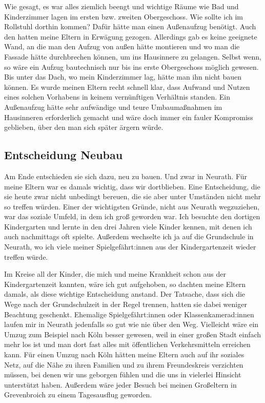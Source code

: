 \documentclass[fontsize=14pt,a4paper,headinclude,DIV=calc,automark]{scrbook}
\begin{document}
Wie gesagt, es war alles ziemlich beengt und wichtige Räume wie Bad und Kinderzimmer lagen im ersten bzw. zweiten Obergeschoss. Wie sollte ich im Rollstuhl dorthin kommen? Dafür hätte man einen Außenaufzug benötigt. Auch den hatten meine Eltern in Erwägung gezogen. Allerdings gab es keine geeignete Wand, an die man den Aufzug von außen hätte montieren und wo man die Fassade hätte durchbrechen können, um ins Hausinnere zu gelangen. Selbst wenn, so wäre ein Aufzug bautechnisch nur bis ins erste Obergeschoss möglich gewesen. Bis unter das Dach, wo mein Kinderzimmer lag, hätte man ihn nicht bauen können. Es wurde meinen Eltern recht schnell klar, dass Aufwand und Nutzen eines solchen Vorhabens in keinem vernünftigen Verhältnis standen. Ein Außenaufzug hätte sehr aufwändige und teure Umbaumaßnahmen im Hausinneren erforderlich gemacht und wäre doch immer ein fauler Kompromiss geblieben, über den man sich später ärgern würde.

\subsection{Entscheidung Neubau}

Am Ende entschieden sie sich dazu, neu zu bauen. Und zwar in Neurath. Für meine Eltern war es damals wichtig, dass wir dortblieben. Eine Entscheidung, die sie heute zwar nicht unbedingt bereuen, die sie aber unter Umständen nicht mehr so treffen würden. Einer der wichtigsten Gründe, nicht aus Neurath wegzuziehen, war das soziale Umfeld, in dem ich groß geworden war. Ich besuchte den dortigen Kindergarten und lernte in den drei Jahren viele Kinder kennen, mit denen ich auch nachmittags oft spielte. Außerdem wechselte ich ja auf die Grundschule in Neurath, wo ich viele meiner Spielgefährt:innen aus der Kindergartenzeit wieder treffen würde.

Im Kreise all der Kinder, die mich und meine Krankheit schon aus der Kindergartenzeit kannten, wäre ich gut aufgehoben, so dachten meine Eltern damals, als diese wichtige Entscheidung anstand. Der Tatsache, dass sich die Wege nach der Grundschulzeit in der Regel trennen, hatten sie dabei weniger Beachtung geschenkt. Ehemalige Spielgefährt:innen oder Klassenkamerad:innen laufen mir in Neurath jedenfalls so gut wie nie über den Weg. Vielleicht wäre ein Umzug zum Beispiel nach Köln besser gewesen, weil in einer großen Stadt einfach mehr los ist und man dort fast alles mit öffentlichen Verkehrsmitteln erreichen kann. Für einen Umzug nach Köln hätten meine Eltern auch auf ihr soziales Netz, auf die Nähe zu ihren Familien und zu ihrem Freundeskreis verzichten müssen, bei denen wir uns geborgen fühlen und die uns in vielerlei Hinsicht unterstützt haben. Außerdem wäre jeder Besuch bei meinen Großeltern in Grevenbroich zu einem Tagesausflug geworden.
\end{document}
